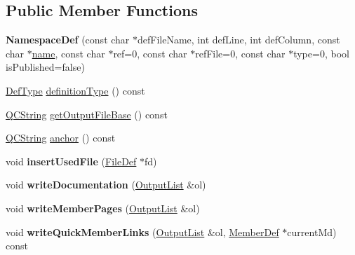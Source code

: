 \subsection*{Public Member Functions}
\begin{DoxyCompactItemize}
\item 
\mbox{\label{class_namespace_def_a6099f6929aae4a799a89c4d0ba1b58fe}} 
{\bfseries Namespace\+Def} (const char $\ast$def\+File\+Name, int def\+Line, int def\+Column, const char $\ast$\mbox{\hyperlink{class_definition_a9324000f785d7b6b098878a3bca4df5b}{name}}, const char $\ast$ref=0, const char $\ast$ref\+File=0, const char $\ast$type=0, bool is\+Published=false)
\item 
\mbox{\hyperlink{class_definition_intf_ada60114bc621669dd8c19edfc6421766}{Def\+Type}} \mbox{\hyperlink{class_namespace_def_a1d3f855eb7cac3c7b13a00d78037823b}{definition\+Type}} () const
\item 
\mbox{\hyperlink{class_q_c_string}{Q\+C\+String}} \mbox{\hyperlink{class_namespace_def_a7baf9b0abdda0393ab156d5a9eedf08f}{get\+Output\+File\+Base}} () const
\item 
\mbox{\hyperlink{class_q_c_string}{Q\+C\+String}} \mbox{\hyperlink{class_namespace_def_ad315129c7f091c2cec0d611a592d98a2}{anchor}} () const
\item 
\mbox{\label{class_namespace_def_adeda08d571157ba904c4511938670ab8}} 
void {\bfseries insert\+Used\+File} (\mbox{\hyperlink{class_file_def}{File\+Def}} $\ast$fd)
\item 
\mbox{\label{class_namespace_def_a77eaae74016fabfb810e241fc4b4acc3}} 
void {\bfseries write\+Documentation} (\mbox{\hyperlink{class_output_list}{Output\+List}} \&ol)
\item 
\mbox{\label{class_namespace_def_a8e0fac3de9d8993493e583dd857117ab}} 
void {\bfseries write\+Member\+Pages} (\mbox{\hyperlink{class_output_list}{Output\+List}} \&ol)
\item 
\mbox{\label{class_namespace_def_a48f6233cf3e209f73f9253e296a94c80}} 
void {\bfseries write\+Quick\+Member\+Links} (\mbox{\hyperlink{class_output_list}{Output\+List}} \&ol, \mbox{\hyperlink{class_member_def}{Member\+Def}} $\ast$current\+Md) const
\item 

\end{DoxyCompactItemize}
